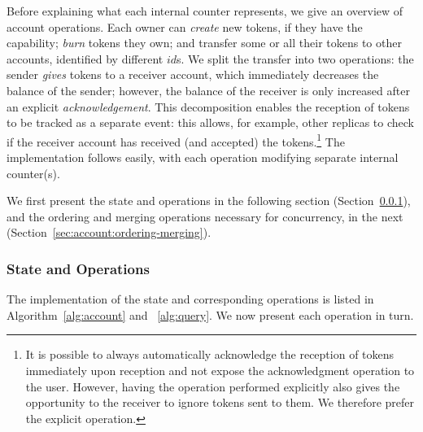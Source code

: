 \documentclass[9pt]{article}   	%
\begin{document}
Before explaining what each internal counter represents, we give an overview of account operations. Each owner can  \textit{create} new tokens, if they have the capability; \textit{burn} tokens they own; and transfer some or all their tokens to other accounts, identified by different $id$s. We split the transfer into two operations: the sender \textit{gives} tokens to a receiver account, which immediately decreases the balance of the sender; however, the balance of the receiver is only increased after an explicit \textit{acknowledgement}. This decomposition enables the reception of tokens to be tracked as a separate event: this allows, for example, other replicas to check if the receiver account has received (and accepted) the tokens.\footnote{It is possible to always automatically acknowledge the reception of tokens immediately upon reception and not expose the acknowledgment operation to the user. However, having the operation performed explicitly also gives the opportunity to the receiver to ignore tokens sent to them. We therefore prefer the explicit operation.} The implementation follows easily, with each operation modifying separate internal counter(s). 

We first present the state and operations in the following section (Section~\ref{sec:account:state-operations}), and the ordering and merging operations necessary for concurrency, in the next (Section~\ref{sec:account:ordering-merging}).

\subsubsection{State and Operations}
\label{sec:account:state-operations}

The implementation of the state and corresponding operations is listed in Algorithm~\ref{alg:account} and ~\ref{alg:query}. We now present each operation in turn.
\end{document}
